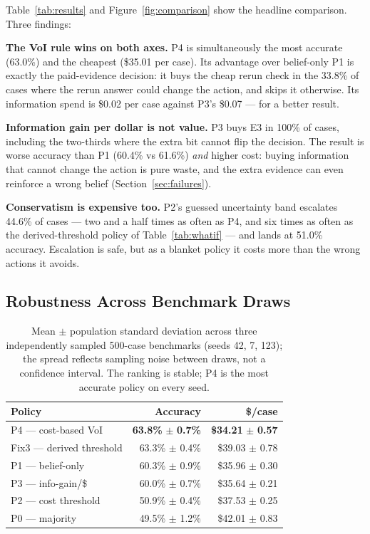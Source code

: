 \documentclass{article}
\begin{document}
Table~\ref{tab:results} and Figure~\ref{fig:comparison} show the headline comparison. Three findings:

\textbf{The VoI rule wins on both axes.} P4 is simultaneously the most accurate (63.0\%) and the cheapest (\$35.01 per case). Its advantage over belief-only P1 is exactly the paid-evidence decision: it buys the cheap rerun check in the 33.8\% of cases where the rerun answer could change the action, and skips it otherwise. Its information spend is \$0.02 per case against P3's \$0.07 --- for a better result.

\textbf{Information gain per dollar is not value.} P3 buys E3 in 100\% of cases, including the two-thirds where the extra bit cannot flip the decision. The result is worse accuracy than P1 (60.4\% vs 61.6\%) \emph{and} higher cost: buying information that cannot change the action is pure waste, and the extra evidence can even reinforce a wrong belief (Section~\ref{sec:failures}).

\textbf{Conservatism is expensive too.} P2's guessed uncertainty band escalates 44.6\% of cases --- two and a half times as often as P4, and six times as often as the derived-threshold policy of Table~\ref{tab:whatif} --- and lands at 51.0\% accuracy. Escalation is safe, but as a blanket policy it costs more than the wrong actions it avoids.

\subsection{Robustness Across Benchmark Draws}

\begin{table}[t]
\centering
\small
\begin{tabular}{lrr}
\toprule
Policy & Accuracy & \$/case \\
\midrule
P4 --- cost-based VoI & \textbf{63.8\%} $\pm$ \textbf{0.7\%} & \textbf{\$34.21} $\pm$ \textbf{0.57} \\
Fix3 --- derived threshold & 63.3\% $\pm$ 0.4\% & \$39.03 $\pm$ 0.78 \\
P1 --- belief-only & 60.3\% $\pm$ 0.9\% & \$35.96 $\pm$ 0.30 \\
P3 --- info-gain/\$ & 60.0\% $\pm$ 0.7\% & \$35.64 $\pm$ 0.21 \\
P2 --- cost threshold & 50.9\% $\pm$ 0.4\% & \$37.53 $\pm$ 0.25 \\
P0 --- majority & 49.5\% $\pm$ 1.2\% & \$42.01 $\pm$ 0.83 \\
\bottomrule
\end{tabular}
\caption{Mean $\pm$ population standard deviation across three independently sampled 500-case benchmarks (seeds 42, 7, 123); the spread reflects sampling noise between draws, not a confidence interval. The ranking is stable; P4 is the most accurate policy on every seed.}
\label{tab:seeds}
\end{table}
\end{document}
